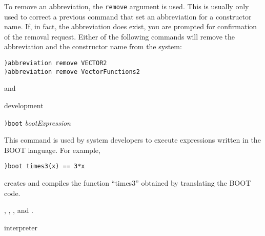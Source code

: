 To remove an abbreviation, the {\tt remove} argument is used.
This is usually
only used to correct a previous command that set an abbreviation for a
constructor name.
If, in fact, the abbreviation does exist, you are prompted
for confirmation of the removal request.
Either of the following commands
will remove the abbreviation  and the
constructor name  from the system:
\begin{verbatim}
)abbreviation remove VECTOR2
)abbreviation remove VectorFunctions2
\end{verbatim}

\par{}
 and




\par{} development

\par{}
\begin{simpleList}
\item {\tt )boot} {\it bootExpression}
\end{simpleList}

\par{}

This command is used by \Language{} system developers to execute
expressions written in the BOOT language.
For example,
\begin{verbatim}
)boot times3(x) == 3*x
\end{verbatim}
creates and compiles the \Lisp{} function ``times3''
obtained by translating the BOOT code.

\par{}
,
,
, and
.




\par{} interpreter

